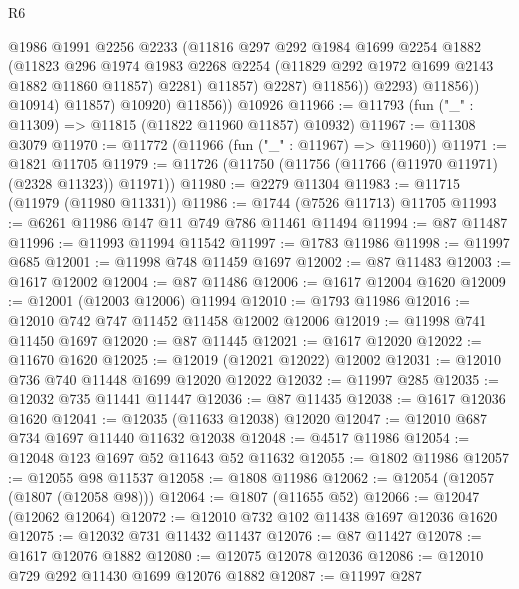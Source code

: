 \begin{lexlean}{R6}
\begin{coremodule}
                          @1986
                          @1991
                          @2256
                          @2233
                          (@11816
                            @297
                            @292
                            @1984
                            @1699
                            @2254
                            @1882
                            (@11823
                              @296
                              @1974
                              @1983
                              @2268
                              @2254
                              (@11829 @292 @1972 @1699 @2143 @1882 @11860 @11857)
                              @2281)
                            @11857)
                          @2287)
                        @11856))
                    @2293)
                  @11856))
              @10914)
            @11857)
          @10920)
        @11856))
    @10926
@11966 := @11793 (fun ("_" : @11309) => @11815 (@11822 @11960 @11857) @10932)
@11967 := @11308 @3079
@11970 := @11772 (@11966 (fun ("_" : @11967) => @11960))
@11971 := @1821 @11705
@11979 := @11726 (@11750 (@11756 (@11766 (@11970 @11971) (@2328 @11323)) @11971))
@11980 := @2279 @11304
@11983 := @11715 (@11979 (@11980 @11331))
@11986 := @1744 (@7526 @11713) @11705
@11993 := @6261 @11986 @147 @11 @749 @786 @11461 @11494
@11994 := @87 @11487
@11996 := @11993 @11994 @11542
@11997 := @1783 @11986
@11998 := @11997 @685
@12001 := @11998 @748 @11459 @1697
@12002 := @87 @11483
@12003 := @1617 @12002
@12004 := @87 @11486
@12006 := @1617 @12004 @1620
@12009 := @12001 (@12003 @12006) @11994
@12010 := @1793 @11986
@12016 := @12010 @742 @747 @11452 @11458 @12002 @12006
@12019 := @11998 @741 @11450 @1697
@12020 := @87 @11445
@12021 := @1617 @12020
@12022 := @11670 @1620
@12025 := @12019 (@12021 @12022) @12002
@12031 := @12010 @736 @740 @11448 @1699 @12020 @12022
@12032 := @11997 @285
@12035 := @12032 @735 @11441 @11447
@12036 := @87 @11435
@12038 := @1617 @12036 @1620
@12041 := @12035 (@11633 @12038) @12020
@12047 := @12010 @687 @734 @1697 @11440 @11632 @12038
@12048 := @4517 @11986
@12054 := @12048 @123 @1697 @52 @11643 @52 @11632
@12055 := @1802 @11986
@12057 := @12055 @98 @11537
@12058 := @1808 @11986
@12062 := @12054 (@12057 (@1807 (@12058 @98)))
@12064 := @1807 (@11655 @52)
@12066 := @12047 (@12062 @12064)
@12072 := @12010 @732 @102 @11438 @1697 @12036 @1620
@12075 := @12032 @731 @11432 @11437
@12076 := @87 @11427
@12078 := @1617 @12076 @1882
@12080 := @12075 @12078 @12036
@12086 := @12010 @729 @292 @11430 @1699 @12076 @1882
@12087 := @11997 @287

\end{coremodule}
\end{lexlean}
